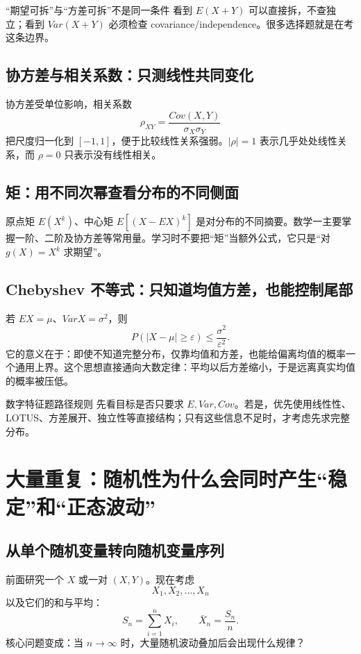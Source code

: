 \documentclass[11pt,a4paper,openany]{ctexbook}
\begin{document}
\begin{boundarybox}{“期望可拆”与“方差可拆”不是同一条件}
看到 $E(X+Y)$ 可以直接拆，不查独立；看到 $Var(X+Y)$ 必须检查 covariance/independence。很多选择题就是在考这条边界。
\end{boundarybox}

\section{协方差与相关系数：只测线性共同变化}
协方差受单位影响，相关系数
\[
\rho_{XY}=\frac{Cov(X,Y)}{\sigma_X\sigma_Y}
\]
把尺度归一化到 $[-1,1]$，便于比较线性关系强弱。$\lvert\rho\rvert=1$ 表示几乎处处线性关系，而 $\rho=0$ 只表示没有线性相关。

\section{矩：用不同次幂查看分布的不同侧面}
原点矩 $E(X^k)$、中心矩 $E[(X-EX)^k]$ 是对分布的不同摘要。数学一主要掌握一阶、二阶及协方差等常用量。学习时不要把“矩”当额外公式，它只是“对 $g(X)=X^k$ 求期望”。

\section{Chebyshev 不等式：只知道均值方差，也能控制尾部}
若 $EX=\mu$、$VarX=\sigma^2$，则
\[
P(\lvert X-\mu\rvert\ge\varepsilon)\le\frac{\sigma^2}{\varepsilon^2}.
\]
它的意义在于：即使不知道完整分布，仅靠均值和方差，也能给偏离均值的概率一个通用上界。这个思想直接通向大数定律：平均以后方差缩小，于是远离真实均值的概率被压低。

\begin{methodbox}{数字特征题路径规则}
先看目标是否只要求 $E,Var,Cov$。若是，优先使用线性性、LOTUS、方差展开、独立性等直接结构；只有这些信息不足时，才考虑先求完整分布。
\end{methodbox}

\chapter{大量重复：随机性为什么会同时产生“稳定”和“正态波动”}

\section{从单个随机变量转向随机变量序列}
前面研究一个 $X$ 或一对 $(X,Y)$。现在考虑
\[
X_1,X_2,\dots,X_n
\]
以及它们的和与平均：
\[
S_n=\sum_{i=1}^nX_i,\qquad \bar X_n=\frac{S_n}{n}.
\]
核心问题变成：当 $n\to\infty$ 时，大量随机波动叠加后会出现什么规律？
\end{document}
